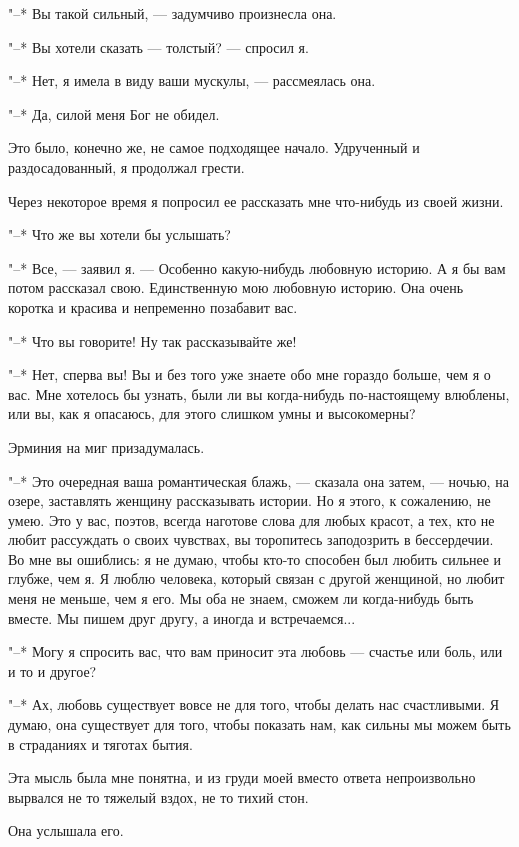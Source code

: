 "--* Вы такой сильный, --- задумчиво произнесла она.

"--* Вы хотели сказать --- толстый? --- спросил я.

"--* Нет, я имела в виду ваши мускулы, --- рассмеялась она.

"--* Да, силой меня Бог не обидел.

Это  было,  конечно  же,  не самое  подходящее  начало.  Удрученный  и
раздосадованный, я продолжал грести.

Через некоторое время я попросил ее рассказать мне что-нибудь из своей
жизни.

"--* Что же вы хотели бы услышать?

"--* Все, --- заявил я.  --- Особенно какую-нибудь любовную историю. А
я бы вам потом рассказал  свою. Единственную мою любовную историю. Она
очень коротка и красива и непременно позабавит вас.

"--* Что вы говорите! Ну так рассказывайте же!

"--* Нет, сперва вы! Вы и без  того уже знаете обо мне гораздо больше,
чем  я  о  вас.  Мне  хотелось бы  узнать,  были  ли  вы  когда-нибудь
по-настоящему влюблены, или вы, как я опасаюсь, для этого слишком умны
и высокомерны?

Эрминия на миг призадумалась.

"--* Это  очередная ваша романтическая  блажь, --- сказала  она затем,
--- ночью,  на озере,  заставлять женщину  рассказывать истории.  Но я
этого, к сожалению, не умею. Это  у вас, поэтов, всегда наготове слова
для любых красот, а тех, кто  не любит рассуждать о своих чувствах, вы
торопитесь заподозрить в бессердечии. Во  мне вы ошиблись: я не думаю,
чтобы кто-то  способен был  любить сильнее  и глубже,  чем я.  Я люблю
человека, который связан  с другой женщиной, но любит  меня не меньше,
чем я  его. Мы оба  не знаем, сможем  ли когда-нибудь быть  вместе. Мы
пишем друг другу, а иногда и встречаемся...

"--* Могу я спросить вас, что  вам приносит эта любовь --- счастье или
боль, или и то и другое?

"--*  Ах,  любовь существует  вовсе  не  для  того, чтобы  делать  нас
счастливыми. Я думаю, она существует для того, чтобы показать нам, как
сильны мы можем быть в страданиях и тяготах бытия.

Эта  мысль   была  мне  понятна,   и  из  груди  моей   вместо  ответа
непроизвольно вырвался не то тяжелый вздох, не то тихий стон.

Она услышала его.

